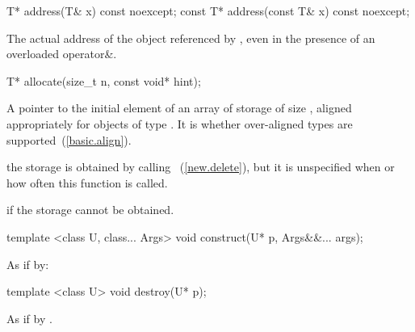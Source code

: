 \begin{itemdecl}
T* address(T& x) const noexcept;
const T* address(const T& x) const noexcept;
\end{itemdecl}

\begin{itemdescr}
\pnum
\returns
The actual address of the object referenced by , even in the presence of an
overloaded operator\&.
\end{itemdescr}

\begin{itemdecl}
T* allocate(size_t n, const void* hint);
\end{itemdecl}

\begin{itemdescr}
\pnum
\returns
A pointer to the initial element of an array of storage of size 
, aligned appropriately for objects of type .
It is  whether over-aligned types are
supported~(\ref{basic.align}).

\pnum
\remark
the storage is obtained by calling ~(\ref{new.delete}),
but it is unspecified when or how often this function is called.

\pnum
\throws
{} if the storage cannot be obtained.
\end{itemdescr}

\begin{itemdecl}
template <class U, class... Args>
  void construct(U* p, Args&&... args);
\end{itemdecl}

\begin{itemdescr}
\pnum
\effects
As if by: 
\end{itemdescr}

\begin{itemdecl}
template <class U>
  void destroy(U* p);
\end{itemdecl}

\begin{itemdescr}
\pnum
\effects
As if by .
\end{itemdescr}

